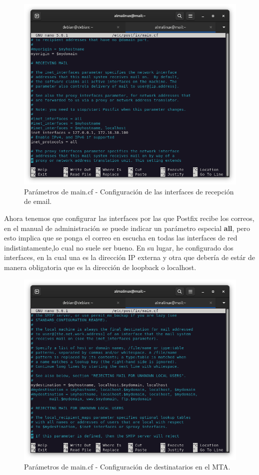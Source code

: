 \begin{figure}[H]
	\centering
	\includegraphics[scale=0.30]{03}
	\caption{Parámetros de main.cf - Configuración de las interfaces de recepción de email.}
\end{figure}

Ahora tenemos que configurar las interfaces por las que Postfix recibe los correos, en el manual de administración se puede indicar un parámetro especial \textbf{all}, pero esto implica que se ponga el correo en escucha en todas las interfaces de red indistintamente,lo cual no suele ser bueno. En su lugar, he configurado dos interfaces, en la cual una es la dirección IP externa y otra que debería de estár de manera obligatoria que es la dirección de loopback o localhost.

\begin{figure}[H]
	\centering
	\includegraphics[scale=0.30]{04}
	\caption{Parámetros de main.cf - Configuración de destinatarios en el MTA.}
\end{figure}

